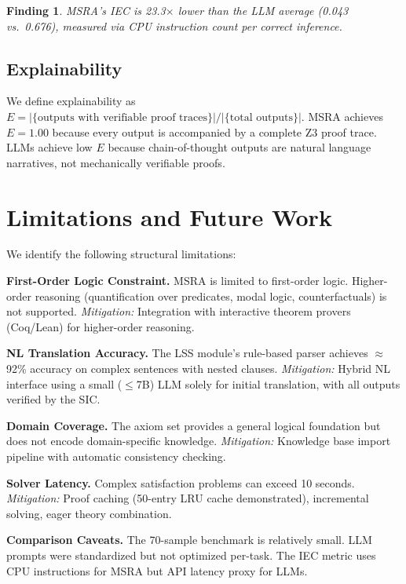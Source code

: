 \documentclass[11pt,a4paper]{article}
\newtheorem*{finding}{Finding}
\begin{document}
\begin{finding}
MSRA's IEC is 23.3$\times$ lower than the LLM average (0.043 vs.\ 0.676), measured via CPU instruction count per correct inference.
\end{finding}

\subsection{Explainability}

We define explainability as $E = |\{\text{outputs with verifiable proof traces}\}| / |\{\text{total outputs}\}|$. MSRA achieves $E=1.00$ because every output is accompanied by a complete Z3 proof trace. LLMs achieve low $E$ because chain-of-thought outputs are natural language narratives, not mechanically verifiable proofs.

\section{Limitations and Future Work}\label{sec:limitations}

We identify the following structural limitations:

\textbf{First-Order Logic Constraint.} MSRA is limited to first-order logic. Higher-order reasoning (quantification over predicates, modal logic, counterfactuals) is not supported. \textit{Mitigation:} Integration with interactive theorem provers (Coq/Lean) for higher-order reasoning.

\textbf{NL Translation Accuracy.} The LSS module's rule-based parser achieves $\approx$92\% accuracy on complex sentences with nested clauses. \textit{Mitigation:} Hybrid NL interface using a small ($\leq$7B) LLM solely for initial translation, with all outputs verified by the SIC.

\textbf{Domain Coverage.} The axiom set provides a general logical foundation but does not encode domain-specific knowledge. \textit{Mitigation:} Knowledge base import pipeline with automatic consistency checking.

\textbf{Solver Latency.} Complex satisfaction problems can exceed 10 seconds. \textit{Mitigation:} Proof caching (50-entry LRU cache demonstrated), incremental solving, eager theory combination.

\textbf{Comparison Caveats.} The 70-sample benchmark is relatively small. LLM prompts were standardized but not optimized per-task. The IEC metric uses CPU instructions for MSRA but API latency proxy for LLMs.
\end{document}
